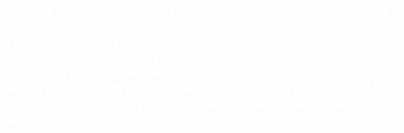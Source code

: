 \documentclass[letterpaper,11pt]{article}
\begin{document}
\vspace{-3pt}
\tiny\textcolor{White}{Keywords: Industry Experience, Algorithm, Software Development, Full stack application, Machine Learning, Natural Language Processing, Computer Vision}
\vspace{-10pt}
\tiny\textcolor{White}{Deep Learning, Data Visualization, Predictive Analysis, Clustering \& Classification, Web Scraping, Model Development, Model Evaluation, Scalable Pipelines, SQL}
\vspace{-10pt}
\tiny\textcolor{White}{Numpy, Sklearn, Linear Regression, XGBoost, word2vec, ELMo word embedding, BERT, Decision Trees, CART, Random Forests, Ensemble Models}
\vspace{-10pt}
\tiny\textcolor{White}{Machine Learning Engineer, Software Engineer, Software Developer, DevOps, Data Engineer, SDE I, SDE II, Agile Development, Websockets}
\end{document}
